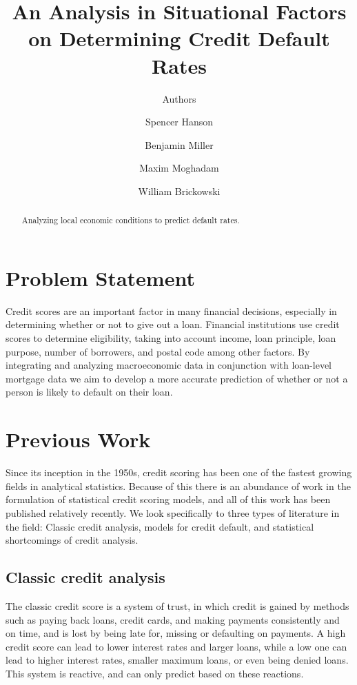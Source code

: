 \documentclass[sigconf, 11pt]{acmart}
\begin{document}
\title{An Analysis in Situational Factors on Determining Credit Default Rates}
\subtitle{Authors}

\author{Spencer Hanson}
\affiliation{}

\author{Benjamin Miller}
\affiliation{}

\author{Maxim Moghadam}
\affiliation{}

\author{William Brickowski}
\affiliation{}

\maketitle

\begin{abstract}
Analyzing local economic conditions to predict default rates.
\end{abstract}

\section{Problem Statement}
Credit scores are an important factor in many financial decisions, especially in determining whether or not to give out a loan. Financial institutions use credit scores to determine eligibility, taking into account income, loan principle, loan purpose, number of borrowers, and postal code among other factors. By integrating and analyzing macroeconomic data in conjunction with loan-level mortgage data we aim to develop a more accurate prediction of whether or not a person is likely to default on their loan.

\section{Previous Work}
Since its inception in the 1950s, credit scoring has been one of the fastest growing fields	in analytical statistics. Because of this there is an abundance of work in the formulation of statistical credit scoring models, and all of this work has been published relatively recently. We look specifically to three types of literature in the field: Classic credit analysis, models for credit default, and statistical shortcomings of credit analysis.

\subsection{Classic credit analysis}
The classic credit score is a system of trust, in which credit is gained by methods such as paying back loans, credit cards, and making payments consistently and on time, and is lost by being late for, missing or defaulting on payments. A high credit score can lead to lower interest rates and larger loans, while a low one can lead to higher interest rates, smaller maximum loans, or even being denied loans. This system is reactive, and can only predict based on these reactions.
\end{document}
